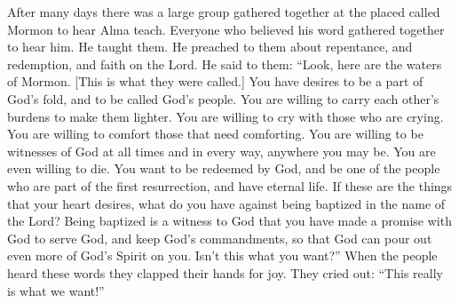 After many days there was a large group gathered together at the placed called Mormon to hear Alma teach. Everyone who believed his word gathered together to hear him. He taught them. He preached to them about repentance, and redemption, and faith on the Lord.
\bverse \iffalse And it came to pass that he said unto them: Behold, here are the waters of Mormon (for thus were they called) and now, as ye are desirous to come into the fold of God, and to be called his people, and are willing to bear one another's burdens, that they may be light; \fi
He said to them: ``Look, here are the waters of Mormon. [This is what they were called.] You have desires to be a part of God's fold, and to be called God's people. You are willing to carry each other's burdens to make them lighter.
\bverse \iffalse Yea, and are willing to mourn with those that mourn; yea, and comfort those that stand in need of comfort, and to stand as witnesses of God at all times and in all things, and in all places that ye may be in, even until death, that ye may be redeemed of God, and be numbered with those of the first resurrection, that ye may have eternal life-- \fi
You are willing to cry with those who are crying. You are willing to comfort those that need comforting. You are willing to be witnesses of God at all times and in every way, anywhere you may be. You are even willing to die. You want to be redeemed by God, and be one of the people who are part of the first resurrection, and have eternal life.
\bverse \iffalse Now I say unto you, if this be the desire of your hearts, what have you against being baptized in the name of the Lord, as a witness before him that ye have entered into a covenant with him, that ye will serve him and keep his commandments, that he may pour out his Spirit more abundantly upon you? \fi
If these are the things that your heart desires, what do you have against being baptized in the name of the Lord? Being baptized is a witness to God that you have made a promise with God to serve God, and keep God's commandments, so that God can pour out even more of God's Spirit on you. Isn't this what you want?''
\bverse \iffalse And now when the people had heard these words, they clapped their hands for joy, and exclaimed: This is the desire of our hearts. \fi
When the people heard these words they clapped their hands for joy. They cried out: ``This really is what we want!''
\bverse \iffalse And now it came to pass that Alma took Helam, he being one of the first, and went and stood forth in the water, and cried, saying: O Lord, pour out thy Spirit upon thy servant, that he may do this work with holiness of heart. \fi
